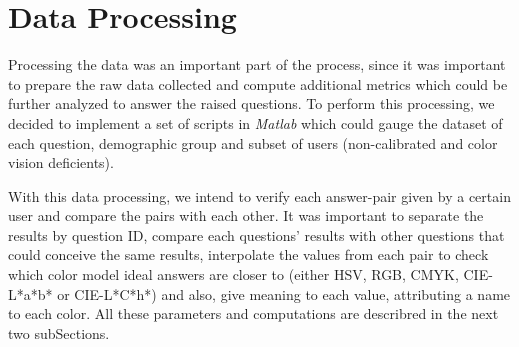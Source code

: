 \section{Data Processing}
\label{sec:results_digest}
%
Processing the data was an important part of the process, since it was important to prepare the raw data collected and compute additional metrics which could be further
analyzed to answer the raised questions. To perform this processing, we decided to implement a set of scripts in \emph{Matlab} which could gauge the dataset of each question,
demographic group and subset of users (non-calibrated and color vision deficients). \par
%
With this data processing, we intend to verify each answer-pair given by a certain user and compare the pairs with each other. It was important to separate the results by question
ID, compare each questions' results with other questions that could conceive the same results, interpolate the values from each pair to check which color model ideal answers are closer
to (either HSV, RGB, CMYK, CIE-L*a*b* or CIE-L*C*h*) and also, give meaning to each value, attributing a name to each color. All these parameters and computations are describred in the next two
subSections.
%
